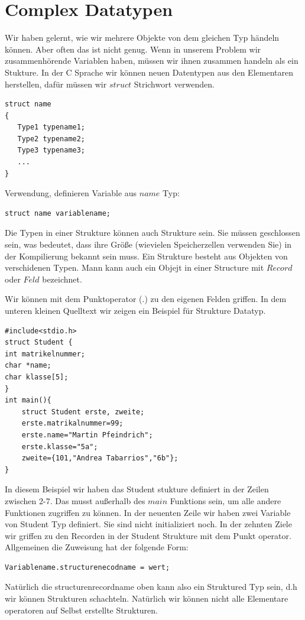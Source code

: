 \documentclass{article}[12pt]
\newenvironment{myalertblock}[1]{%
    \tcolorbox[beamer,%
    noparskip,breakable,
    colback=White,colframe=Bittersweet,%
    colbacklower=Peach!75!White,%
    title=#1]}%
    {\endtcolorbox}
\begin{document}
\section{Complex Datatypen}
Wir haben gelernt, wie wir mehrere Objekte von dem gleichen Typ händeln
können. Aber often das ist nicht genug. Wenn in unserem Problem
wir zusammenhörende Variablen haben, müssen wir ihnen zusammen handeln
als ein Stukture. In der C Sprache wir können neuen Datentypen aus
den Elementaren herstellen, dafür müssen wir $struct$ Strichwort
verwenden.
\begin{myalertblock}{struct Typdefinierung}
\begin{lstlisting}
struct name
{
   Type1 typename1;
   Type2 typename2;
   Type3 typename3;
   ...
}
\end{lstlisting}
\vspace{-0.4cm}
Verwendung, definieren Variable aus $name$ Typ:
\begin{lstlisting}
struct name variablename;
\end{lstlisting}
\vspace{-0.4cm} 
Die Typen in einer Strukture können auch Strukture sein.
Sie müssen geschlossen sein, was bedeutet, dass ihre Größe
(wievielen Speicherzellen verwenden Sie) in der Kompilierung
bekannt sein muss.
\end{myalertblock}
Ein Strukture besteht aus Objekten von verschidenen Typen. 
Mann kann auch ein Objejt in einer Structure mit $Record$ 
oder $Feld$ bezeichnet.

Wir können mit dem Punktoperator (.) zu den eigenen Felden
griffen. In dem unteren kleinen Quelltext wir zeigen ein Beispiel
für Strukture Datatyp.
\begin{lstlisting}
#include<stdio.h>
struct Student { 
int matrikelnummer;
char *name;
char klasse[5];
}
int main(){
    struct Student erste, zweite;
    erste.matrikalnummer=99;
    erste.name="Martin Pfeindrich";
    erste.klasse="5a";
    zweite={101,"Andrea Tabarrios","6b"};
}
\end{lstlisting}
In diesem Beispiel wir haben das Student stukture definiert in der Zeilen zwischen 2-7.
Das musst außerhalb des $main$ Funktions sein, um alle andere Funktionen zugriffen zu können.
In der neuenten Zeile wir haben zwei Variable von Student Typ definiert. Sie sind 
nicht initializiert noch. In der zehnten Ziele wir griffen zu den Recorden in der
Student Strukture mit dem Punkt operator. Allgemeinen die Zuweisung hat der folgende Form:
\begin{lstlisting}
Variablename.structurenecodname = wert;
\end{lstlisting}
Natürlich die structurenrecordname oben kann also ein Struktured Typ sein, d.h wir können
Strukturen schachteln.
Natürlich wir können nicht alle Elementare operatoren auf Selbst
erstellte Strukturen.
\end{document}
